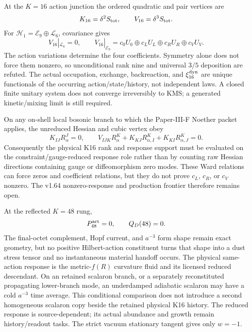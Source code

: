 \documentclass[12pt,a4paper]{article}
\begin{document}
\begin{theorem}
\label{p8:thm:v164-k16-action-vertex-rank}
At the \(K=16\) action junction the ordered quadratic and pair vertices are
\[
 K_{16}=\delta^2S_{\rm tot},
 \qquad V_{16}=\delta^3S_{\rm tot}.
\]
For
\(\mathcal H_1=\mathcal E_9\oplus\mathcal L_6\), covariance gives
\[
 V_{16}|_{\mathcal L_6}=0,
 \qquad
 V_{16}|_{\mathcal E_9}
 =c_0U_0\oplus c_LU_L\oplus c_RU_R\oplus c_VU_V.
\]
The action variations determine the four coefficients.  Symmetry alone does
not force them nonzero, so unconditional rank nine and universal \(3/5\)
deposition are refuted.  The actual occupation, exchange, backreaction, and
\(\xi_{16}^{\rm dyn}\) are unique functionals of the occurring
action/state/history, not independent laws.  A closed finite unitary system
does not converge irreversibly to KMS; a generated kinetic/mixing limit is
still required.
\end{theorem}


\begin{corollary}
\label{p8:cor:v176-k16-ward-reduced-response}
On any on-shell local bosonic branch to which the Paper-III-F Noether packet
applies, the unreduced Hessian and cubic vertex obey
\[
 K_{IJ}R_\alpha^J=0,
 \qquad
 V_{IJK}R_\alpha^K+K_{KJ}R_{\alpha,I}^K+K_{KI}R_{\alpha,J}^K=0.
\]
Consequently the physical K16 rank and response support must be evaluated on
the constraint/gauge-reduced response role rather than by counting raw
Hessian directions containing gauge or diffeomorphism zero modes.  These Ward
relations can force zeros and coefficient relations, but they do not prove
\(c_L\), \(c_R\), or \(c_V\) nonzero.  The v1.64 nonzero-response and
production frontier therefore remains open.
\end{corollary}


\begin{theorem}
\label{p8:thm:v164-k48-response-replacement}
At the reflected \(K=48\) rung,
\[
 P_{48}^{\rm act}=0,
 \qquad Q_D(48)=0.
\]
The final-octet complement, Hopf current, and \(a^{-3}\) form shape remain
exact geometry, but no positive Hilbert-action constituent turns that shape
into a dust stress tensor and no instantaneous material handoff occurs.  The
physical same-action response is the metric-\(f(R)\) curvature fluid and its
licensed reduced descendant.  On an retained scalaron branch, or a
separately reconstituted propagating lower-branch mode, an underdamped
adiabatic scalaron may have a cold \(a^{-3}\) time average.  This conditional
comparison does not introduce a second homogeneous scalaron copy beside the
retained physical K16 history.  The reduced response is source-dependent;
its actual abundance and growth remain history/readout tasks.  The strict
vacuum stationary tangent gives only \(w=-1\).
\end{theorem}
\end{document}
